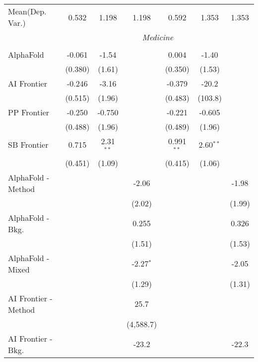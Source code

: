 \begin{tabular}{lcccccc}
Mean(Dep. Var.) & 0.532 & 1.198 & 1.198 & 0.592 & 1.353 & 1.353 \\
 & \multicolumn{6}{c}{\textit{Medicine}} \\ \\
   AlphaFold            & -0.061  & -1.54       &             & 0.004        & -1.40       &   \\   
                        & (0.380) & (1.61)      &             & (0.350)      & (1.53)      &   \\   
   AI Frontier          & -0.246  & -3.16       &             & -0.379       & -20.2       &   \\   
                        & (0.515) & (1.96)      &             & (0.483)      & (103.8)     &   \\   
   PP Frontier          & -0.250  & -0.750      &             & -0.221       & -0.605      &   \\   
                        & (0.488) & (1.96)      &             & (0.489)      & (1.96)      &   \\   
   SB Frontier          & 0.715   & 2.31$^{**}$ &             & 0.991$^{**}$ & 2.60$^{**}$ &   \\   
                        & (0.451) & (1.09)      &             & (0.415)      & (1.06)      &   \\   
   AlphaFold - Method   &         &             & -2.06       &              &             & -1.98\\   
                        &         &             & (2.02)      &              &             & (1.99)\\   
   AlphaFold - Bkg.     &         &             & 0.255       &              &             & 0.326\\   
                        &         &             & (1.51)      &              &             & (1.53)\\   
   AlphaFold - Mixed    &         &             & -2.27$^{*}$ &              &             & -2.05\\   
                        &         &             & (1.29)      &              &             & (1.31)\\   
   AI Frontier - Method &         &             & 25.7        &              &             &   \\   
                        &         &             & (4,588.7)   &              &             &   \\   
   AI Frontier - Bkg.   &         &             & -23.2       &              &             & -22.3\\   

\end{tabular}
